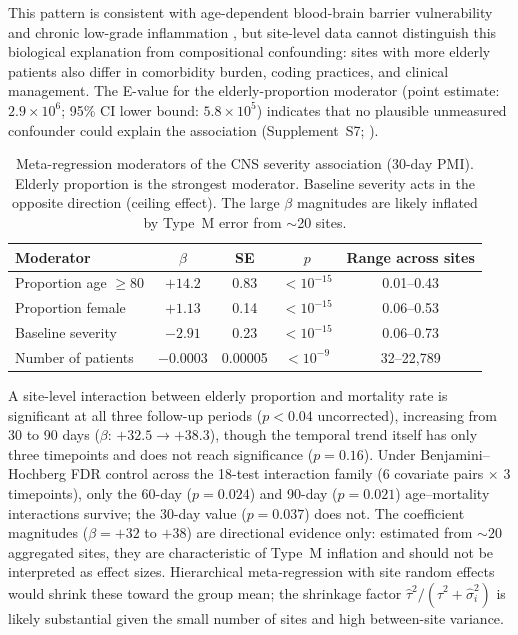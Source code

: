 \documentclass[11pt]{article}
\begin{document}
This pattern is consistent with age-dependent blood-brain barrier
vulnerability \cite{montagne2015bbb} and chronic low-grade inflammation
\cite{franceschi2018inflammaging}, but site-level data cannot distinguish
this biological explanation from compositional confounding: sites with more
elderly patients also differ in comorbidity burden, coding practices, and
clinical management.  The E-value for the elderly-proportion moderator
(point estimate: $2.9 \times 10^{6}$; 95\% CI lower bound:
$5.8 \times 10^{5}$) indicates that no plausible unmeasured confounder
could explain the association (Supplement~S7; \cite{vanderweele2017}).

\begin{table}[t]
\centering
\caption{Meta-regression moderators of the CNS severity association (30-day
PMI).  Elderly proportion is the strongest moderator.  Baseline severity
acts in the opposite direction (ceiling effect).  The large $\beta$
magnitudes are likely inflated by Type~M error \cite{gelman2014typeMS} from
$\sim$20 sites.}
\label{tab:moderators}
\begin{tabular}{lcccc}
\toprule
Moderator & $\beta$ & SE & $p$ & Range across sites \\
\midrule
Proportion age $\geq 80$ & $+14.2$ & 0.83 & $< 10^{-15}$ & 0.01--0.43 \\
Proportion female & $+1.13$ & 0.14 & $< 10^{-15}$ & 0.06--0.53 \\
Baseline severity & $-2.91$ & 0.23 & $< 10^{-15}$ & 0.06--0.73 \\
Number of patients & $-0.0003$ & 0.00005 & $< 10^{-9}$ & 32--22{,}789 \\
\bottomrule
\end{tabular}
\end{table}

A site-level interaction between elderly proportion and mortality rate is
significant at all three follow-up periods ($p < 0.04$ uncorrected),
increasing from 30 to 90 days ($\beta$: $+32.5 \to +38.3$), though the
temporal trend itself has only three timepoints and does not reach
significance ($p = 0.16$).  Under Benjamini--Hochberg FDR control \cite{benjamini1995fdr} across the
18-test interaction family (6 covariate pairs $\times$ 3 timepoints),
only the 60-day ($p = 0.024$) and 90-day ($p = 0.021$) age--mortality
interactions survive; the 30-day value ($p = 0.037$) does not.  The
coefficient magnitudes ($\beta = +32$ to $+38$) are directional evidence
only: estimated from ${\sim}20$ aggregated sites, they are characteristic
of Type~M inflation \cite{gelman2014typeMS} and should not be interpreted
as effect sizes.  Hierarchical meta-regression with site random effects
\cite{gelman2012multilevel} would shrink these toward the group mean;
the shrinkage factor $\hat\tau^2 / (\hat\tau^2 + \hat\sigma_i^2)$ is
likely substantial given the small number of sites and high between-site
variance.
\end{document}

